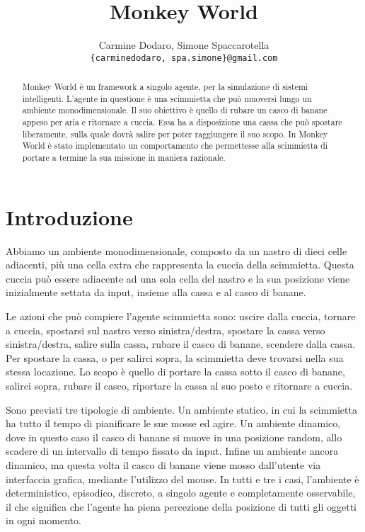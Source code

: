 \documentclass[a4paper,10pt]{article}
\title{Monkey World}
\author{
    Carmine Dodaro, Simone Spaccarotella \\
    \texttt{\{carminedodaro, spa.simone\}@gmail.com}
}
\begin{document}
    \maketitle

    \begin{abstract}
	Monkey World è un framework a singolo agente, per la simulazione di sistemi intelligenti. L'agente
	in questione è una scimmietta che può muoversi lungo un ambiente monodimensionale. Il suo obiettivo è quello di rubare un
	casco di banane appeso per aria e ritornare a cuccia. Essa ha a disposizione una cassa che può spostare liberamente, sulla quale dovrà salire per poter
	raggiungere il suo scopo. In Monkey World è stato implementato un comportamento che permettesse alla scimmietta di portare a termine
	la sua missione in maniera razionale.
    \end{abstract}

    \section{Introduzione}
	Abbiamo un ambiente monodimensionale, composto da un nastro di dieci celle adiacenti, più una cella extra che
	rappresenta la cuccia della scimmietta. Questa cuccia può essere adiacente ad una sola cella del nastro e la sua
	posizione viene inizialmente settata da input, insieme alla cassa e al casco di banane.
	
	Le azioni che può compiere l'agente scimmietta sono: uscire dalla cuccia, tornare a cuccia,
	spostarsi sul nastro verso sinistra/destra, spostare la cassa verso sinistra/destra, salire sulla cassa,
	rubare il casco di banane, scendere dalla cassa. Per spostare la cassa, o per salirci sopra, la scimmietta deve trovarsi
	nella sua stessa locazione. Lo scopo è quello di portare la cassa sotto il casco di banane, salirci sopra, rubare il casco, 
	riportare la cassa al suo posto e ritornare a cuccia.
	
	Sono previsti tre tipologie di ambiente. Un ambiente statico, in cui la scimmietta ha tutto il tempo di pianificare le sue mosse
	ed agire. Un ambiente dinamico, dove in questo caso il casco di banane si muove in una posizione random, allo scadere di un intervallo di tempo fissato
	da input. Infine un ambiente ancora dinamico, ma questa volta il casco di banane viene mosso dall'utente via interfaccia grafica, mediante
	l'utilizzo del mouse. In tutti e tre i casi, l'ambiente è deterministico, episodico, discreto, a singolo agente e completamente osservabile,
	il che significa che l'agente ha piena percezione della posizione di tutti gli oggetti in ogni momento.
	
\end{document}
